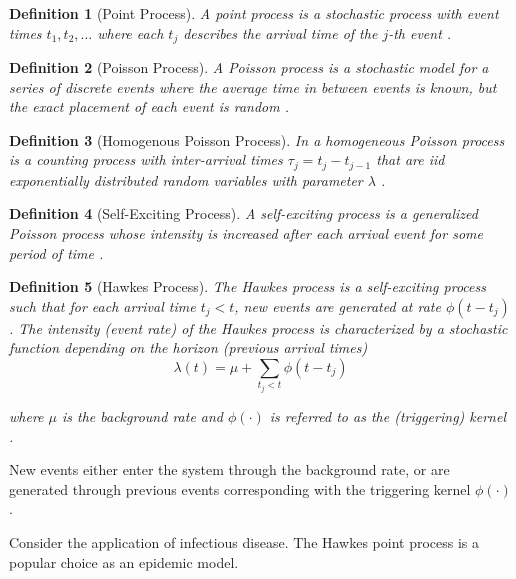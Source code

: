 \documentclass[12pt]{article}
\newtheorem{definition}{Definition}
\begin{document}
\begin{definition}[Point Process]
A point process is a stochastic process with event times $t_1, t_2, \ldots$ where each $t_j$ describes the arrival time of the $j$-th event \cite{Rizoiu2018}.
\end{definition}
\vspace{3mm}

\begin{definition}[Poisson Process]
A Poisson process is a stochastic model for a series of discrete events where the average time in between events is known, but the exact placement of each event is random \cite{Rizoiu2018}. 
\end{definition}
\vspace{3mm}

\begin{definition}[Homogenous Poisson Process]
In a homogeneous Poisson process is a counting process with inter-arrival times $\tau_j = t_j - t_{j-1}$ that are iid exponentially distributed random variables with parameter $\lambda$ \cite{Rizoiu2018}. 
\end{definition}
\vspace{3mm}

\begin{definition}[Self-Exciting Process] 
A self-exciting process is a generalized Poisson process whose intensity is increased after each arrival event for some period of time \cite{Dahlqvist2022}.
\end{definition}
\vspace{3mm}

\begin{definition}[Hawkes Process]
The Hawkes process is a self-exciting process such that for each arrival time $t_j < t$, new events are generated at rate $\phi(t - t_j)$. The intensity (event rate) of the Hawkes process is characterized by a stochastic function depending on the horizon (previous arrival times)
$$
\lambda(t) = \mu + \sum_{t_j < t} \phi(t - t_j)
$$

where $\mu$ is the background rate and $\phi(\cdot)$ is referred to as the (triggering) kernel \cite{Rizoiu2018, Reinhart2018}.
\end{definition}
\vspace{3mm}
New events either enter the system through the background rate, or are generated through previous events corresponding with the triggering kernel $\phi(\cdot)$. 


Consider the application of infectious disease. The Hawkes point process is a popular choice as an epidemic model. 
\vspace{3mm}
\end{document}
